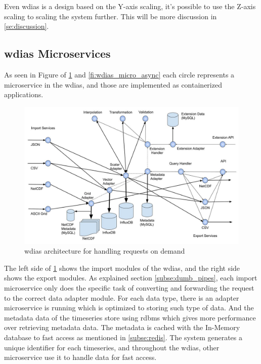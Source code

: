 Even \acrshort{wdias} is a design based on the Y-axis scaling, it's possible to use the Z-axis scaling to scaling the system further. This will be more discussion in \cref{se:discussion}.




\subsection{\acrshort{wdias} Microservices}
\label{sebse:wdias_microservices}
As seen in Figure of \cref{fi:wdias_micro_on_demand} and \cref{fi:wdias_micro_async} each circle represents a microservice in the \acrshort{wdias}, and those are implemented as containerized applications.
\begin{figure}[htp]
    \centering
    \includegraphics[width=1\textwidth]{method/microservice/microservice_architecture-handle_on_demand-v3.jpg}
    \caption{\acrshort{wdias} architecture for handling requests on demand}
    \label{fi:wdias_micro_on_demand}
\end{figure}
The left side of \cref{fi:wdias_micro_on_demand} shows the import modules of the \acrshort{wdias}, and the right side shows the export modules. As explained section \cref{subse:dumb_pipes}, each import microservice only does the specific task of converting and forwarding the request to the correct data adapter module.
For each data type, there is an adapter microservice is running which is optimized to storing such type of data. And the metadata data of the timeseries store using \acrshort{rdbms} which gives more performance over retrieving metadata data. The metadata is cached with the In-Memory database to fast access as mentioned in \cref{subse:redis}.
The system generates a unique identifier for each timeseries, and throughout the \acrshort{wdias}, other microservice use it to handle data for fast access.

